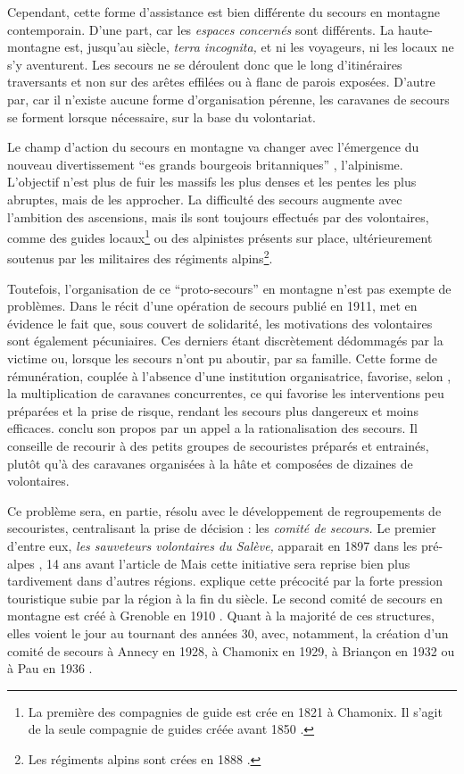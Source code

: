 Cependant, cette forme d'assistance est bien différente du secours en
montagne contemporain. D'une part, car les \emph{espaces concernés}
sont différents. La haute-montagne est, jusqu'au 
siècle, \emph{terra incognita,} et ni les voyageurs, ni les locaux ne
s'y aventurent. Les secours ne se déroulent donc que le long
d'itinéraires traversants et non sur des arêtes effilées ou à flanc de
parois exposées. D'autre par, car il n'existe aucune forme
d'organisation pérenne, les caravanes de secours se forment lorsque
nécessaire, sur la base du volontariat.

Le champ d'action du secours en montagne va changer avec l’émergence
du nouveau divertissement \enquote{es grands bourgeois
  britanniques} \autocite{Descamps2018}, l'alpinisme. L'objectif n'est
plus de fuir les massifs les plus denses et les pentes les plus
abruptes, mais de les approcher. La difficulté des secours augmente
avec l'ambition des ascensions, mais ils sont toujours effectués par
des volontaires, comme des guides locaux\footnote{La première des
  compagnies de guide est crée en 1821 à Chamonix. Il s'agit de la
  seule compagnie de guides créée avant 1850
  \autocite{ContributeursWikipedia2020b}.} ou des alpinistes présents
sur place, ultérieurement soutenus par les militaires des régiments
alpins\footnote{Les régiments alpins sont crées en 1888
  \autocite{Mezin2016}.}.

Toutefois, l'organisation de ce \enquote{proto-secours} en montagne
n'est pas exempte de problèmes. Dans le récit d'une opération de
secours publié en 1911, \textcite{Thomas1911} met en évidence le fait
que, sous couvert de solidarité, les motivations des volontaires sont
également pécuniaires. Ces derniers étant discrètement dédommagés par
la victime ou, lorsque les secours n'ont pu aboutir, par sa
famille. Cette forme de rémunération, couplée à l'absence d'une
institution organisatrice, favorise, selon \textcite{Thomas1911}, la
multiplication de caravanes concurrentes, ce qui favorise les
interventions peu préparées et la prise de risque, rendant les secours
plus dangereux et moins efficaces. \textcite{Thomas1911} conclu son
propos par un appel a la rationalisation des secours. Il conseille de
recourir à des petits groupes de secouristes préparés et entrainés,
plutôt qu'à des caravanes organisées à la hâte et composées de
dizaines de volontaires.

Ce problème sera, en partie, résolu avec le développement de
regroupements de secouristes, centralisant la prise de décision : les
\emph{comité de secours.} Le premier d'entre eux, \emph{les sauveteurs
  volontaires du Salève,} apparait en 1897 dans les pré-alpes
\autocite{CFDLD}, 14 ans avant l'article de  Mais cette
initiative sera reprise bien plus tardivement dans d'autres
régions. \textcite{Caille2016} explique cette précocité par la forte
pression touristique subie par la région à la fin du 
siècle.  Le second comité de secours en montagne est créé à Grenoble
en 1910 \autocite{CFDLD,Caille2016}. Quant à la majorité de ces
structures, elles voient le jour au tournant des années 30, avec,
notamment, la création d'un comité de secours à Annecy en 1928, à
Chamonix en 1929, à Briançon en 1932 ou à Pau en 1936 \autocite{CFDLD,
  Devies1946}.

